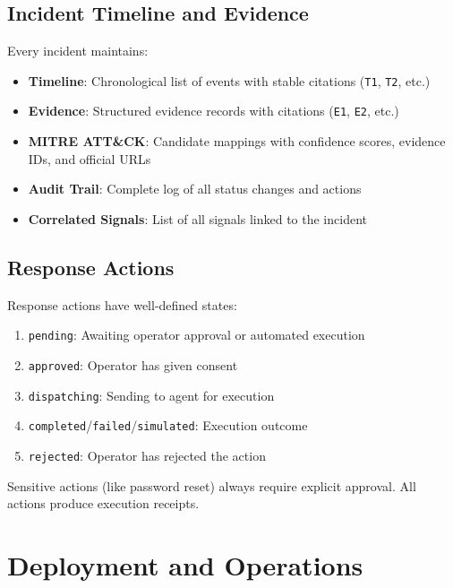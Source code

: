 \documentclass[12pt,a4paper,twoside]{report}
\begin{document}
\section{Incident Timeline and Evidence}
Every incident maintains:
\begin{itemize}[noitemsep]
    \item \textbf{Timeline}: Chronological list of events with stable citations (\texttt{T1}, \texttt{T2}, etc.)
    \item \textbf{Evidence}: Structured evidence records with citations (\texttt{E1}, \texttt{E2}, etc.)
    \item \textbf{MITRE ATT\&CK}: Candidate mappings with confidence scores, evidence IDs, and official URLs
    \item \textbf{Audit Trail}: Complete log of all status changes and actions
    \item \textbf{Correlated Signals}: List of all signals linked to the incident
\end{itemize}

\section{Response Actions}
Response actions have well-defined states:
\begin{enumerate}[label=\texttt{\textcolor{blue}{\arabic*}}, leftmargin=*]
    \item \texttt{pending}: Awaiting operator approval or automated execution
    \item \texttt{approved}: Operator has given consent
    \item \texttt{dispatching}: Sending to agent for execution
    \item \texttt{completed}/\texttt{failed}/\texttt{simulated}: Execution outcome
    \item \texttt{rejected}: Operator has rejected the action
\end{enumerate}

Sensitive actions (like password reset) always require explicit approval. All actions produce execution receipts.

\clearpage

\chapter{Deployment and Operations}
\label{chap:deployment}
\end{document}
